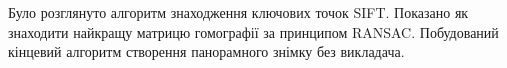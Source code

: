 \chapterConclusion

Було розглянуто алгоритм знаходження ключових точок SIFT.
Показано як знаходити найкращу матрицю гомографії за 
принципом RANSAC. Побудований кінцевий алгоритм створення
панорамного знімку без викладача.